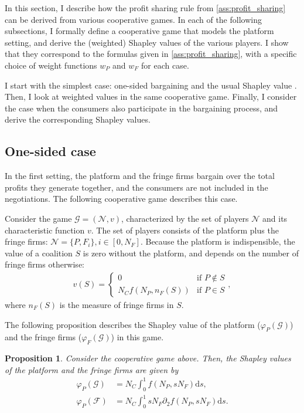 \documentclass[a4paper]{article}
\newtheorem{proposition}{Proposition}
\newcommand{\ds}{\mathrm{d}s}
\begin{document}
In this section, I describe how the profit sharing rule from \cref{ass:profit_sharing} can be derived from various cooperative games.
In each of the following subsections, I formally define a cooperative game that models the platform setting, and derive the (weighted) Shapley values of the various players.
I show that they correspond to the formulas given in \cref{ass:profit_sharing}, with a specific choice of weight functions $w_P$ and $w_F$ for each case.

I start with the simplest case: one-sided bargaining and the usual Shapley value \parencite{shapley1953additive}.
Then, I look at weighted values \parencite{weber1988probabilistic} in the same cooperative game.
Finally, I consider the case when the consumers also participate in the bargaining process, and derive the corresponding Shapley values.

\subsection{One-sided case}
\label{sec:cooperative_game_one_sided}

In the first setting, the platform and the fringe firms bargain over the total profits they generate together, and the consumers are not included in the negotiations.
The following cooperative game describes this case.

Consider the game $\mathcal{G} = (\mathcal{N}, v)$, characterized by the set of players $\mathcal{N}$ and its characteristic function $v$.
The set of players consists of the platform plus the fringe firms: $\mathcal{N} = \{P, F_i\}, i \in [0, N_F]$.
Because the platform is indispensible, the value of a coalition $S$ is zero without the platform, and depends on the number of fringe firms otherwise:
\begin{align*}
    v(S) = \begin{cases}
        0 & \text{if } P \notin S \\
        N_C f(N_P, n_F(S)) & \text{if } P \in S
    \end{cases},
\end{align*}
where $n_F(S)$ is the measure of fringe firms in $S$.

The following proposition describes the Shapley value of the platform ($\varphi_P(\mathcal{G})$) and the fringe firms ($\varphi_F(\mathcal{G})$) in this game.

\begin{proposition}
    \label{prop:profit_sharing_one_sided}
    Consider the cooperative game above.
    Then, the Shapley values of the platform and the fringe firms are given by
    \begin{align*}
        \varphi_P(\mathcal{G}) &= N_C \int_0^1 f(N_P, s N_F) \ds, \\
        \varphi_P(\mathcal{F}) &= N_C \int_0^1 s N_F \partial_2 f(N_P, s N_F) \ds.
    \end{align*}
\end{proposition}
\end{document}
